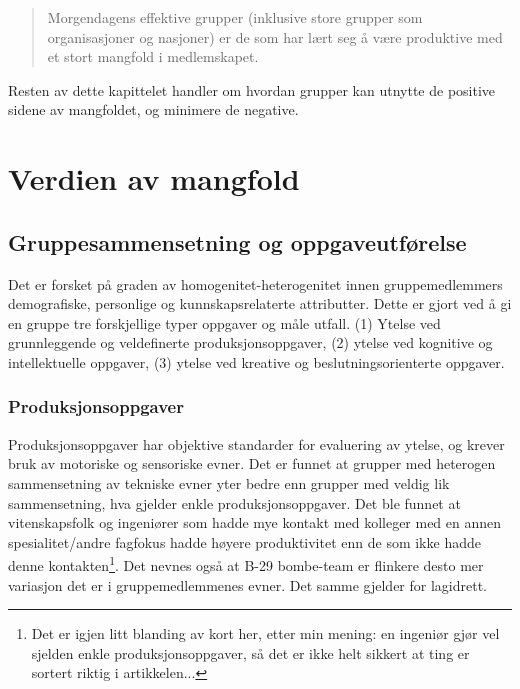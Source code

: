 \documentclass[11pt]{article}
\begin{document}
		\begin{quote} Morgendagens effektive grupper (inklusive store grupper som organisasjoner og nasjoner) er de som har lært seg å være produktive med et stort mangfold i medlemskapet. \end{quote}
		
		Resten av dette kapittelet handler om hvordan grupper kan utnytte de positive sidene av mangfoldet, og minimere de negative.
		
	\section{Verdien av mangfold}
		\subsection{Gruppesammensetning og oppgaveutførelse}
			Det er forsket på graden av homogenitet-heterogenitet innen gruppemedlemmers demografiske, personlige og kunnskapsrelaterte attributter. Dette er gjort ved å gi en gruppe tre forskjellige typer oppgaver og måle utfall. (1) Ytelse ved grunnleggende og veldefinerte produksjonsoppgaver, (2) ytelse ved kognitive og intellektuelle oppgaver, (3) ytelse ved kreative og beslutningsorienterte oppgaver.
			
			\subsubsection{Produksjonsoppgaver}
				Produksjonsoppgaver har objektive standarder for evaluering av ytelse, og krever bruk av motoriske og sensoriske evner. Det er funnet at grupper med heterogen sammensetning av tekniske evner yter bedre enn grupper med veldig lik sammensetning, hva gjelder enkle produksjonsoppgaver. 
				\newline \newline
				Det ble funnet at vitenskapsfolk og ingeniører som hadde mye kontakt med kolleger med en annen spesialitet/andre fagfokus hadde høyere produktivitet enn de som ikke hadde denne kontakten\footnote{Det er igjen litt blanding av kort her, etter min mening: en ingeniør gjør vel sjelden enkle produksjonsoppgaver, så det er ikke helt sikkert at ting er sortert riktig i artikkelen...}. Det nevnes også at B-29 bombe-team er flinkere desto mer variasjon det er i gruppemedlemmenes evner. Det samme gjelder for lagidrett.
				
\end{document}
